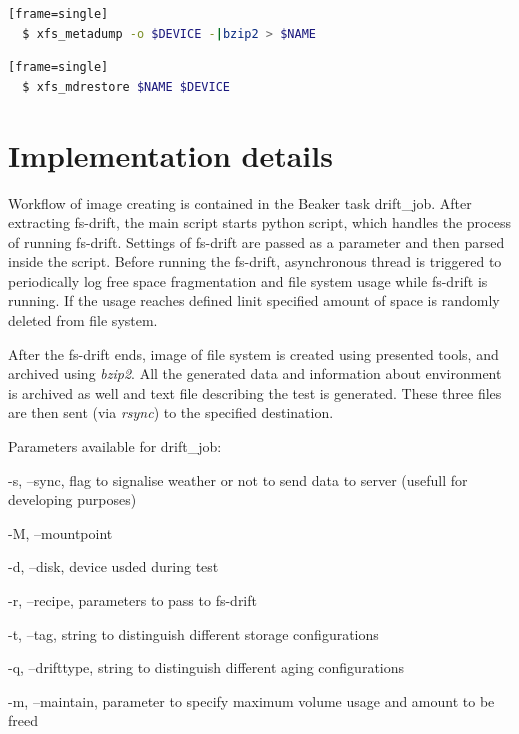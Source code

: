 \documentclass[
  color, %
  table, %
  lof,   %
  lot,   %
]{fithesis3}
\begin{document}
\begin{lstlisting}[language=bash, label={ex:xfs_metadump}, caption={Creating compressed image using \textit{xfs\_metadump}}][frame=single]
  $ xfs_metadump -o $DEVICE -|bzip2 > $NAME
\end{lstlisting}

\begin{lstlisting}[language=bash, label={ex:xfs_mdrestore},caption={Reloading image using \textit{xfs\_mdrestore}}][frame=single]
  $ xfs_mdrestore $NAME $DEVICE
\end{lstlisting}

\section{Implementation details}
Workflow of image creating is contained in the Beaker task drift\_job. After extracting fs-drift, the main script starts python script, which handles the process of running fs-drift. Settings of fs-drift are passed as a parameter and then parsed inside the script. Before running the fs-drift, asynchronous thread is triggered to periodically log free space fragmentation and file system usage while fs-drift is running. If the usage reaches defined linit specified amount of space is randomly deleted from file system\footnotemark[2].


After the fs-drift ends, image of file system is created using presented tools, and archived using \textit{bzip2}. All the generated data and information about environment is archived as well and text file describing the test is generated. These three files are then sent (via \textit{rsync}) to the specified destination.

Parameters available for drift\_job:
\begin{compactenum}
  \item -s, --sync, flag to signalise weather or not to send data to server (usefull for developing purposes)
  \item -M, --mountpoint
  \item -d, --disk, device usded during test
  \item -r, --recipe, parameters to pass to fs-drift
  \item -t, --tag, string to distinguish different storage configurations
  \item -q, --drifttype, string to distinguish different aging configurations
  \item -m, --maintain, parameter to specify maximum volume usage and amount to be freed
  \end{compactenum}
\end{document}
